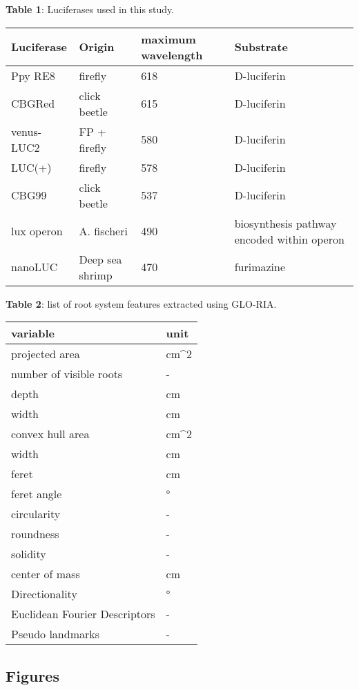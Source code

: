 \documentclass[]{article}
\begin{document}
\textbf{Table 1}: Luciferases used in this study.

\begin{longtable}[c]{@{}llll@{}}
\toprule
Luciferase & Origin & maximum wavelength & Substrate\tabularnewline
\midrule
\endhead
Ppy RE8 & firefly & 618 & D-luciferin\tabularnewline
CBGRed & click beetle & 615 & D-luciferin\tabularnewline
venus-LUC2 & FP + firefly & 580 & D-luciferin\tabularnewline
LUC(+) & firefly & 578 & D-luciferin\tabularnewline
CBG99 & click beetle & 537 & D-luciferin\tabularnewline
lux operon & A. fischeri & 490 & biosynthesis pathway encoded within
operon\tabularnewline
nanoLUC & Deep sea shrimp & 470 & furimazine\tabularnewline
\bottomrule
\end{longtable}

\textbf{Table 2}: list of root system features extracted using GLO-RIA.

\begin{longtable}[c]{@{}ll@{}}
\toprule
variable & unit\tabularnewline
\midrule
\endhead
projected area & cm\^{}2\tabularnewline
number of visible roots & -\tabularnewline
depth & cm\tabularnewline
width & cm\tabularnewline
convex hull area & cm\^{}2\tabularnewline
width & cm\tabularnewline
feret & cm\tabularnewline
feret angle & °\tabularnewline
circularity & -\tabularnewline
roundness & -\tabularnewline
solidity & -\tabularnewline
center of mass & cm\tabularnewline
Directionality & °\tabularnewline
Euclidean Fourier Descriptors & -\tabularnewline
Pseudo landmarks & -\tabularnewline
\bottomrule
\end{longtable}

\pagebreak

\subsection{Figures}\label{figures}
\end{document}
